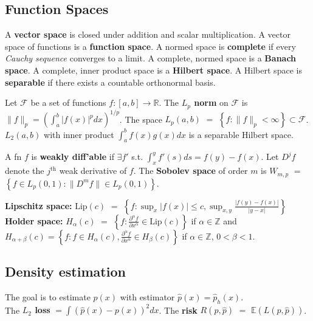 \documentclass[10pt,twocolumn]{article}
\begin{document}
\subsection*{Function Spaces}
    A \textbf{vector space} is closed under addition and scalar multiplication. 
    A vector space of functions is a \textbf{function space}. 
    A normed space is \textbf{complete} if every \emph{Cauchy sequence} converges to a limit. 
    A complete, normed space is a \textbf{Banach space}. 
    A complete, inner product space is a \textbf{Hilbert space}.%
    A Hilbert space is \textbf{separable} if there exists a countable orthonormal basis.

    Let $\mathcal{F}$ be a set of functions $f:[a,b] \rightarrow \mathbb{R}$.  
    The \textbf{$L_p$ norm} on $\mathcal{F}$ is $\| f \|_p = \left( \int_a^b |f(x)|^p dx  \right)^{1/p}$\hspace{-2mm}. 
    The space $L_p(a,b)$ $=$ $\left\{  f : \| f \|_p < \infty \right\} \subset \mathcal{F}$.
    $L_2(a,b)$ with inner product $\int_a^b f(x)g(x) dx$ is a separable Hilbert space.

    A fn $f$ is \textbf{weakly diff'able} if $\exists f'$ s.t. $\int_x^y f'(s) ds = f(y) - f(x)$.
    Let $D^jf$ denote the $j^{\text{th}}$ weak derivative of $f$.
    The \textbf{Sobolev space} of order $m$ is $W_{m,p}$ $=$ $\left\{ f \in L_p(0,1) : \|D^m f\| \in L_p(0,1) \right\}$.

    \textbf{Lipschitz space:} $\text{Lip}(c)$ $=$ $\left\{ f : \sup_x |f(x)| \leq c, \sup_{x,y} \frac{|f(y)-f(x)|}{|y-x|} \right\}$
    \textbf{Holder space:} $H_{\alpha}(c)$ $=$ $\left\{ f : \frac{\partial^{\alpha} f}{\partial x^{\alpha}} \in \text{Lip}(c) \right\}$ 
        if $\alpha \in \mathbb{Z}$ and\\
    $H_{\alpha+\beta}(c) = \left\{ f : f \in H_{\alpha}(c), \frac{\partial^{\alpha} f}{\partial x^{\alpha}} \in H_{\beta}(c) \right\}$ 
        if $\alpha \in \mathbb{Z}$, $0 < \beta < 1$.

\subsection*{Density estimation}
    The goal is to estimate $p(x)$ with estimator $\hat{p}(x) = \hat{p}_h(x)$. \\
    The \textbf{$L_2$ loss} $= \int \left( \hat{p}(x) - p(x) \right)^2 dx$.
    The \textbf{risk} $R(p,\hat{p})$ $=$ $\mathbb{E}(L(p,\hat{p}))$.
\end{document}
